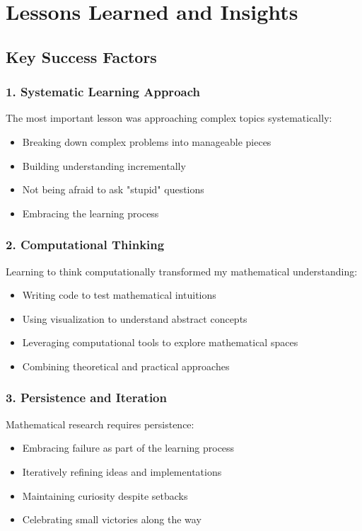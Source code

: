 \documentclass[12pt]{article}
\begin{document}
\section{Lessons Learned and Insights}

\subsection{Key Success Factors}

\subsubsection{1. Systematic Learning Approach}

The most important lesson was approaching complex topics systematically:
\begin{itemize}
    \item Breaking down complex problems into manageable pieces
    \item Building understanding incrementally
    \item Not being afraid to ask "stupid" questions
    \item Embracing the learning process
\end{itemize}

\subsubsection{2. Computational Thinking}

Learning to think computationally transformed my mathematical understanding:
\begin{itemize}
    \item Writing code to test mathematical intuitions
    \item Using visualization to understand abstract concepts
    \item Leveraging computational tools to explore mathematical spaces
    \item Combining theoretical and practical approaches
\end{itemize}

\subsubsection{3. Persistence and Iteration}

Mathematical research requires persistence:
\begin{itemize}
    \item Embracing failure as part of the learning process
    \item Iteratively refining ideas and implementations
    \item Maintaining curiosity despite setbacks
    \item Celebrating small victories along the way
\end{itemize}
\end{document}

